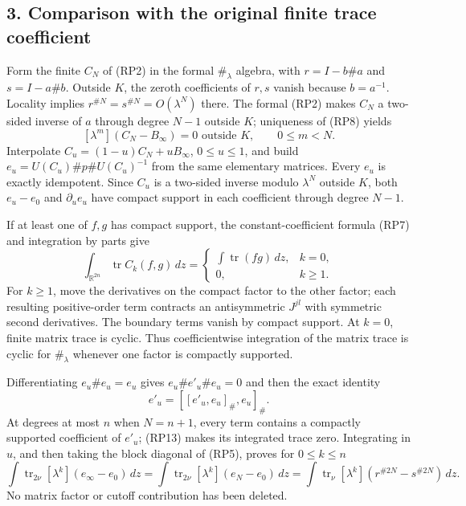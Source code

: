\documentclass[
  11pt,
]{article}
\begin{document}
\subsection{3. Comparison with the original finite trace
coefficient}\label{comparison-with-the-original-finite-trace-coefficient}

Form the finite \(C_N\) of (RP2) in the formal \(\#_\lambda\) algebra,
with \(r=I-b\#a\) and \(s=I-a\#b\). Outside \(K\), the zeroth
coefficients of \(r,s\) vanish because \(b=a^{-1}\). Locality implies
\(r^{\#N}=s^{\#N}=O(\lambda^N)\) there. The formal (RP2) makes \(C_N\) a
two-sided inverse of \(a\) through degree \(N-1\) outside \(K\);
uniqueness of (RP8) yields \[
 [\lambda^m](C_N-B_\infty)=0\text{ outside }K,
 \qquad 0\le m<N.
 \tag{RP12}
\] Interpolate \(C_u=(1-u)C_N+uB_\infty\), \(0\le u\le1\), and build
\(e_u=U(C_u)\#p\#U(C_u)^{-1}\) from the same elementary matrices. Every
\(e_u\) is exactly idempotent. Since \(C_u\) is a two-sided inverse
modulo \(\lambda^N\) outside \(K\), both \(e_u-e_0\) and
\(\partial_u e_u\) have compact support in each coefficient through
degree \(N-1\).

If at least one of \(f,g\) has compact support, the constant-coefficient
formula (RP7) and integration by parts give \[
 \int_{\mathbb R^{2n}}\operatorname{tr}C_k(f,g)\,dz
  =\begin{cases}
    \int\operatorname{tr}(fg)\,dz,&k=0,\\
    0,&k\ge1.
    \end{cases}
 \tag{RP13}
\] For \(k\ge1\), move the derivatives on the compact factor to the
other factor; each resulting positive-order term contracts an
antisymmetric \(J^{jl}\) with symmetric second derivatives. The boundary
terms vanish by compact support. At \(k=0\), finite matrix trace is
cyclic. Thus coefficientwise integration of the matrix trace is cyclic
for \(\#_\lambda\) whenever one factor is compactly supported.

Differentiating \(e_u\#e_u=e_u\) gives \(e_u\#e'_u\#e_u=0\) and then the
exact identity \[
 e'_u=[[e'_u,e_u]_\# ,e_u]_\#.
 \tag{RP14}
\] At degrees at most \(n\) when \(N=n+1\), every term contains a
compactly supported coefficient of \(e'_u\); (RP13) makes its integrated
trace zero. Integrating in \(u\), and then taking the block diagonal of
(RP5), proves for \(0\le k\le n\) \[
 \int\operatorname{tr}_{2\nu}[\lambda^k](e_\infty-e_0)\,dz
  =\int\operatorname{tr}_{2\nu}[\lambda^k](e_N-e_0)\,dz
  =\int\operatorname{tr}_{\nu}[\lambda^k]
       (r^{\#2N}-s^{\#2N})\,dz .
 \tag{RP15}
\] No matrix factor or cutoff contribution has been deleted.
\end{document}
